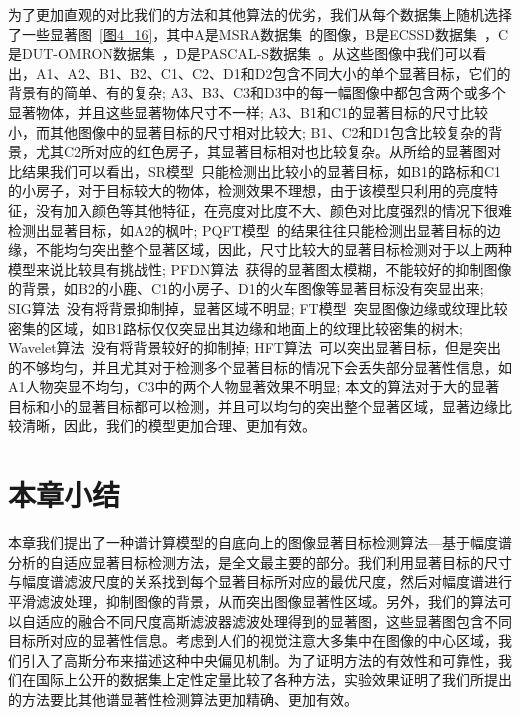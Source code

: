 为了更加直观的对比我们的方法和其他算法的优劣，我们从每个数据集上随机选择了一些显著图~\ref{图4_16}，其中A是MSRA数据集~\cite{LiuTieCVPR2007Learning}的图像，B是ECSSD数据集~\cite{YanQiongCVPR2013Hierarchical}，C是DUT-OMRON数据集~\cite{YangChuanCVPR2013Manifold}，D是PASCAL-S数据集~\cite{LiYinCVPR2014Secrets}。从这些图像中我们可以看出，A1、A2、B1、B2、C1、C2、D1和D2包含不同大小的单个显著目标，它们的背景有的简单、有的复杂; A3、B3、C3和D3中的每一幅图像中都包含两个或多个显著物体，并且这些显著物体尺寸不一样; A3、B1和C1的显著目标的尺寸比较小，而其他图像中的显著目标的尺寸相对比较大; B1、C2和D1包含比较复杂的背景，尤其C2所对应的红色房子，其显著目标相对也比较复杂。从所给的显著图对比结果我们可以看出，SR模型~\cite{HouXiaodiCVPR2007Residual}只能检测出比较小的显著目标，如B1的路标和C1的小房子，对于目标较大的物体，检测效果不理想，由于该模型只利用的亮度特征，没有加入颜色等其他特征，在亮度对比度不大、颜色对比度强烈的情况下很难检测出显著目标，如A2的枫叶; PQFT模型~\cite{GuoChenleiCVPR2008Spatio}的结果往往只能检测出显著目标的边缘，不能均匀突出整个显著区域，因此，尺寸比较大的显著目标检测对于以上两种模型来说比较具有挑战性; PFDN算法~\cite{BianCognNeurodyn2010Visual}获得的显著图太模糊，不能较好的抑制图像的背景，如B2的小鹿、C1的小房子、D1的火车图像等显著目标没有突显出来; SIG算法~\cite{HouXiaodiTPAMI2012Signature}没有将背景抑制掉，显著区域不明显; FT模型~\cite{AchantaCVPR2009Frequency}突显图像边缘或纹理比较密集的区域，如B1路标仅仅突显出其边缘和地面上的纹理比较密集的树木; Wavelet算法~\cite{ImamogluTMM2013wavelet}没有将背景较好的抑制掉; HFT算法~\cite{LiJianTPAMI2013Scale}可以突出显著目标，但是突出的不够均匀，并且尤其对于检测多个显著目标的情况下会丢失部分显著性信息，如A1人物突显不均匀，C3中的两个人物显著效果不明显; 本文的算法对于大的显著目标和小的显著目标都可以检测，并且可以均匀的突出整个显著区域，显著边缘比较清晰，因此，我们的模型更加合理、更加有效。

\section{本章小结}
\label{4_3}

本章我们提出了一种谱计算模型的自底向上的图像显著目标检测算法---基于幅度谱分析的自适应显著目标检测方法，是全文最主要的部分。我们利用显著目标的尺寸与幅度谱滤波尺度的关系找到每个显著目标所对应的最优尺度，然后对幅度谱进行平滑滤波处理，抑制图像的背景，从而突出图像显著性区域。另外，我们的算法可以自适应的融合不同尺度高斯滤波器滤波处理得到的显著图，这些显著图包含不同目标所对应的显著性信息。考虑到人们的视觉注意大多集中在图像的中心区域，我们引入了高斯分布来描述这种中央偏见机制。为了证明方法的有效性和可靠性，我们在国际上公开的数据集上定性定量比较了各种方法，实验效果证明了我们所提出的方法要比其他谱显著性检测算法更加精确、更加有效。

















